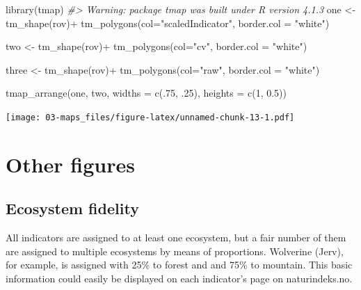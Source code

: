 \documentclass[
]{book}
\newenvironment{Shaded}{\begin{snugshade}}{\end{snugshade}}
\newcommand{\AttributeTok}[1]{\textcolor[rgb]{0.77,0.63,0.00}{#1}}
\newcommand{\CommentTok}[1]{\textcolor[rgb]{0.56,0.35,0.01}{\textit{#1}}}
\newcommand{\DecValTok}[1]{\textcolor[rgb]{0.00,0.00,0.81}{#1}}
\newcommand{\FloatTok}[1]{\textcolor[rgb]{0.00,0.00,0.81}{#1}}
\newcommand{\FunctionTok}[1]{\textcolor[rgb]{0.00,0.00,0.00}{#1}}
\newcommand{\NormalTok}[1]{#1}
\newcommand{\OtherTok}[1]{\textcolor[rgb]{0.56,0.35,0.01}{#1}}
\newcommand{\SpecialCharTok}[1]{\textcolor[rgb]{0.00,0.00,0.00}{#1}}
\newcommand{\StringTok}[1]{\textcolor[rgb]{0.31,0.60,0.02}{#1}}
\begin{document}
\begin{Shaded}
\begin{Highlighting}[]
\FunctionTok{library}\NormalTok{(tmap)}
\CommentTok{\#\textgreater{} Warning: package \textquotesingle{}tmap\textquotesingle{} was built under R version 4.1.3}
\NormalTok{one }\OtherTok{\textless{}{-}} \FunctionTok{tm\_shape}\NormalTok{(rov)}\SpecialCharTok{+}
  \FunctionTok{tm\_polygons}\NormalTok{(}\AttributeTok{col=}\StringTok{"scaledIndicator"}\NormalTok{, }
              \AttributeTok{border.col =} \StringTok{"white"}\NormalTok{)}

\NormalTok{two }\OtherTok{\textless{}{-}} \FunctionTok{tm\_shape}\NormalTok{(rov)}\SpecialCharTok{+}
  \FunctionTok{tm\_polygons}\NormalTok{(}\AttributeTok{col=}\StringTok{"cv"}\NormalTok{, }
              \AttributeTok{border.col =} \StringTok{"white"}\NormalTok{)}

\NormalTok{three }\OtherTok{\textless{}{-}} \FunctionTok{tm\_shape}\NormalTok{(rov)}\SpecialCharTok{+}
  \FunctionTok{tm\_polygons}\NormalTok{(}\AttributeTok{col=}\StringTok{"raw"}\NormalTok{, }
              \AttributeTok{border.col =} \StringTok{"white"}\NormalTok{)}


\FunctionTok{tmap\_arrange}\NormalTok{(one, two, }
             \AttributeTok{widths =} \FunctionTok{c}\NormalTok{(.}\DecValTok{75}\NormalTok{, .}\DecValTok{25}\NormalTok{),}
             \AttributeTok{heights =} \FunctionTok{c}\NormalTok{(}\DecValTok{1}\NormalTok{, }\FloatTok{0.5}\NormalTok{))}
\end{Highlighting}
\end{Shaded}

\texttt{[image: 03-maps\_files/figure-latex/unnamed-chunk-13-1.pdf]}

\hypertarget{other-figures}{%
\chapter{Other figures}\label{other-figures}}

\hypertarget{ecosystem-fidelity}{%
\section{Ecosystem fidelity}\label{ecosystem-fidelity}}

All indicators are assigned to at least one ecosystem, but a fair number of them are assigned to multiple ecosystems by means of proportions. Wolverine (Jerv), for example, is assigned with 25\% to forest and and 75\% to mountain. This basic information could easily be displayed on each indicator's page on naturindeks.no.
\end{document}
